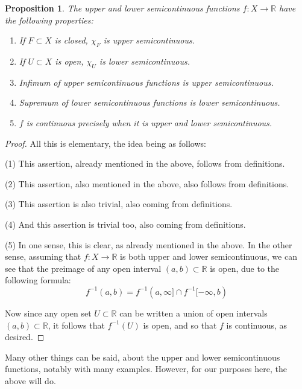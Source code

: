 \documentclass[12pt]{amsbook}
\newtheorem{proposition}[theorem]{Proposition}
\begin{document}
\begin{proposition}
The upper and lower semicontinuous functions $f:X\to\mathbb R$ have the following properties:
\begin{enumerate}
\item If $F\subset X$ is closed, $\chi_F$ is upper semicontinuous.

\item If $U\subset X$ is open, $\chi_U$ is lower semicontinuous.

\item Infimum of upper semicontinuous functions is upper semicontinuous.

\item Supremum of lower semicontinuous functions is lower semicontinuous.

\item $f$ is continuous precisely when it is upper and lower semicontinuous.
\end{enumerate}
\end{proposition}

\begin{proof}
All this is elementary, the idea being as follows:

\medskip

(1) This assertion, already mentioned in the above, follows from definitions.

\medskip

(2) This assertion, also mentioned in the above, also follows from definitions.

\medskip

(3) This assertion is also trivial, also coming from definitions.

\medskip

(4) And this assertion is trivial too, also coming from definitions.

\medskip

(5) In one sense, this is clear, as already mentioned in the above. In the other sense, assuming that $f:X\to\mathbb R$ is both upper and lower semicontinuous, we can see that the preimage of any open interval $(a,b)\subset\mathbb R$ is open, due to the following formula:
$$f^{-1}(a,b)=f^{-1}(a,\infty]\cap f^{-1}[-\infty,b)$$

Now since any open set $U\subset\mathbb R$ can be written a union of open intervals $(a,b)\subset\mathbb R$, it follows that $f^{-1}(U)$ is open, and so that $f$ is continuous, as desired.
\end{proof}

Many other things can be said, about the upper and lower semicontinuous functions, notably with many examples. However, for our purposes here, the above will do.
\end{document}
